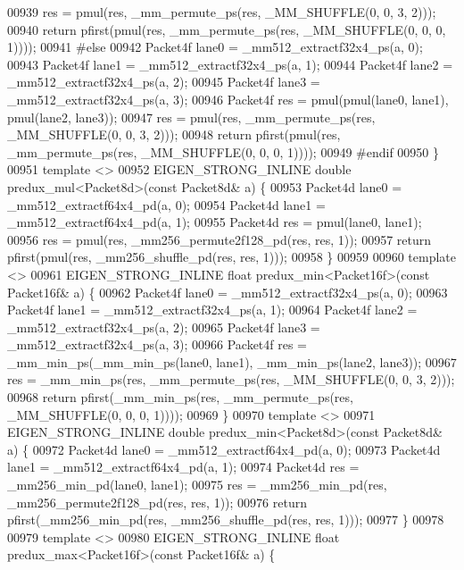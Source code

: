 \begin{DoxyCode}
00939   res = pmul(res, \_mm\_permute\_ps(res, \_MM\_SHUFFLE(0, 0, 3, 2)));
00940   \textcolor{keywordflow}{return} pfirst(pmul(res, \_mm\_permute\_ps(res, \_MM\_SHUFFLE(0, 0, 0, 1))));
00941 \textcolor{preprocessor}{#else}
00942   Packet4f lane0 = \_mm512\_extractf32x4\_ps(a, 0);
00943   Packet4f lane1 = \_mm512\_extractf32x4\_ps(a, 1);
00944   Packet4f lane2 = \_mm512\_extractf32x4\_ps(a, 2);
00945   Packet4f lane3 = \_mm512\_extractf32x4\_ps(a, 3);
00946   Packet4f res = pmul(pmul(lane0, lane1), pmul(lane2, lane3));
00947   res = pmul(res, \_mm\_permute\_ps(res, \_MM\_SHUFFLE(0, 0, 3, 2)));
00948   \textcolor{keywordflow}{return} pfirst(pmul(res, \_mm\_permute\_ps(res, \_MM\_SHUFFLE(0, 0, 0, 1))));
00949 \textcolor{preprocessor}{#endif}
00950 \}
00951 \textcolor{keyword}{template} <>
00952 EIGEN\_STRONG\_INLINE \textcolor{keywordtype}{double} predux\_mul<Packet8d>(\textcolor{keyword}{const} Packet8d& a) \{
00953   Packet4d lane0 = \_mm512\_extractf64x4\_pd(a, 0);
00954   Packet4d lane1 = \_mm512\_extractf64x4\_pd(a, 1);
00955   Packet4d res = pmul(lane0, lane1);
00956   res = pmul(res, \_mm256\_permute2f128\_pd(res, res, 1));
00957   \textcolor{keywordflow}{return} pfirst(pmul(res, \_mm256\_shuffle\_pd(res, res, 1)));
00958 \}
00959 
00960 \textcolor{keyword}{template} <>
00961 EIGEN\_STRONG\_INLINE \textcolor{keywordtype}{float} predux\_min<Packet16f>(\textcolor{keyword}{const} Packet16f& a) \{
00962   Packet4f lane0 = \_mm512\_extractf32x4\_ps(a, 0);
00963   Packet4f lane1 = \_mm512\_extractf32x4\_ps(a, 1);
00964   Packet4f lane2 = \_mm512\_extractf32x4\_ps(a, 2);
00965   Packet4f lane3 = \_mm512\_extractf32x4\_ps(a, 3);
00966   Packet4f res = \_mm\_min\_ps(\_mm\_min\_ps(lane0, lane1), \_mm\_min\_ps(lane2, lane3));
00967   res = \_mm\_min\_ps(res, \_mm\_permute\_ps(res, \_MM\_SHUFFLE(0, 0, 3, 2)));
00968   \textcolor{keywordflow}{return} pfirst(\_mm\_min\_ps(res, \_mm\_permute\_ps(res, \_MM\_SHUFFLE(0, 0, 0, 1))));
00969 \}
00970 \textcolor{keyword}{template} <>
00971 EIGEN\_STRONG\_INLINE \textcolor{keywordtype}{double} predux\_min<Packet8d>(\textcolor{keyword}{const} Packet8d& a) \{
00972   Packet4d lane0 = \_mm512\_extractf64x4\_pd(a, 0);
00973   Packet4d lane1 = \_mm512\_extractf64x4\_pd(a, 1);
00974   Packet4d res = \_mm256\_min\_pd(lane0, lane1);
00975   res = \_mm256\_min\_pd(res, \_mm256\_permute2f128\_pd(res, res, 1));
00976   \textcolor{keywordflow}{return} pfirst(\_mm256\_min\_pd(res, \_mm256\_shuffle\_pd(res, res, 1)));
00977 \}
00978 
00979 \textcolor{keyword}{template} <>
00980 EIGEN\_STRONG\_INLINE \textcolor{keywordtype}{float} predux\_max<Packet16f>(\textcolor{keyword}{const} Packet16f& a) \{

\end{DoxyCode}
